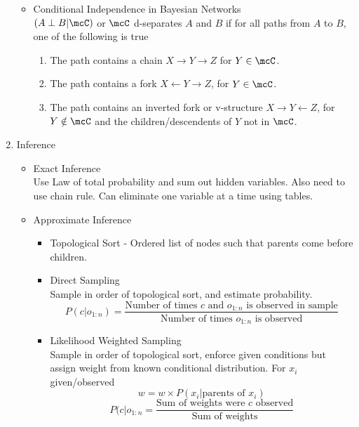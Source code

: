 \documentclass[10pt, oneside]{article}
\begin{document}
\begin{enumerate}
\begin{itemize}
        \item Conditional Independence in Bayesian Networks \\
          $(A \perp B | \mcC)$ or $\mcC$ d-separates $A$ and $B$ if for all
          paths from $A$ to $B$, one of the following is true
          \begin{enumerate}
            \item The path contains a chain $X \to Y \to Z$ for $Y \in \mcC$.
            \item The path contains a fork $X \gets Y \to Z$, for $Y \in \mcC$.
            \item The path contains an inverted fork or v-structure
              $X \to Y \gets Z$, for $Y \notin \mcC$ and the children/descendents
              of $Y$ not in $\mcC$.
          \end{enumerate}
      \end{itemize}

    \item Inference
      \begin{itemize}
        \item Exact Inference \\
          Use Law of total probability and sum out hidden variables.
          Also need to use chain rule.
          Can eliminate one variable at a time using tables.

        \item Approximate Inference
          \begin{itemize}
            \item Topological Sort - Ordered list of nodes such that parents
              come before children.

            \item Direct Sampling \\
              Sample in order of topological sort, and estimate probability.
              \[
                P(c|o_{1:n}) = \frac{\text{Number of times $c$ and $o_{1:n}$ is observed in sample}}{\text{Number of times $o_{1:n}$ is observed}}
              \]

            \item Likelihood Weighted Sampling \\
              Sample in order of topological sort, enforce given conditions but
              assign weight from known conditional distribution.
              For $x_i$ given/observed
              \[
                w = w \times P(x_i | \text{parents of } x_i)
              \]
              \[
                P(c|o_{1:n} = \frac{\text{Sum of weights were $c$ observed}}{\text{Sum of weights}}
              \]


\end{itemize}
\end{itemize}
\end{enumerate}
\end{document}
